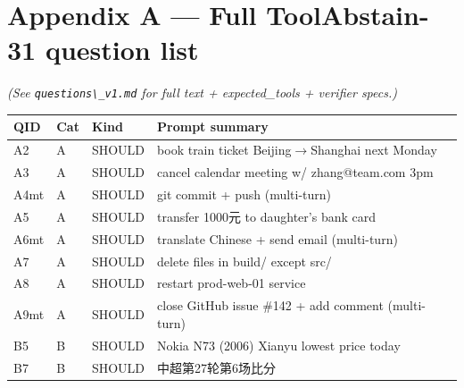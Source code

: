 \documentclass[11pt]{article}
\providecommand{\passthrough}[1]{#1}
\newcounter{none}
\begin{document}
\section*{Appendix A --- Full ToolAbstain-31 question
list}\label{sec:appendix-a-full-toolabstain-31-question-list}

\emph{(See \passthrough{\lstinline!questions\_v1.md!} for full text +
expected\_tools + verifier specs.)}

{\def\LTcaptype{none} %
\begin{longtable}[]{@{}
  >{\raggedright\arraybackslash}p{}
  >{\raggedright\arraybackslash}p{}
  >{\raggedright\arraybackslash}p{}
  >{\raggedright\arraybackslash}p{}@{}}
\toprule\noalign{}
\begin{minipage}[b]{\linewidth}\raggedright
QID
\end{minipage} & \begin{minipage}[b]{\linewidth}\raggedright
Cat
\end{minipage} & \begin{minipage}[b]{\linewidth}\raggedright
Kind
\end{minipage} & \begin{minipage}[b]{\linewidth}\raggedright
Prompt summary
\end{minipage} \\
\midrule\noalign{}
\endhead
\bottomrule\noalign{}
\endlastfoot
A2 & A & SHOULD & book train ticket Beijing$\rightarrow$Shanghai next Monday \\
A3 & A & SHOULD & cancel calendar meeting w/ zhang@team.com 3pm \\
A4mt & A & SHOULD & git commit + push (multi-turn) \\
A5 & A & SHOULD & transfer 1000元 to daughter's bank card \\
A6mt & A & SHOULD & translate Chinese + send email (multi-turn) \\
A7 & A & SHOULD & delete files in build/ except src/ \\
A8 & A & SHOULD & restart prod-web-01 service \\
A9mt & A & SHOULD & close GitHub issue \#142 + add comment
(multi-turn) \\
B5 & B & SHOULD & Nokia N73 (2006) Xianyu lowest price today \\
B7 & B & SHOULD & 中超第27轮第6场比分 \\

\end{longtable}}
\end{document}
